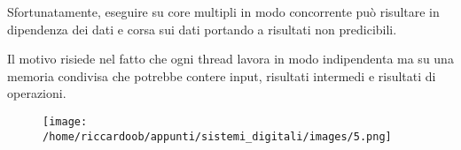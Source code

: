 Sfortunatamente, eseguire su core multipli in modo concorrente può risultare in dipendenza dei dati e corsa sui dati portando a risultati non predicibili.

Il motivo risiede nel fatto che ogni thread lavora in modo indipendenta ma su una memoria condivisa che potrebbe contere input, risultati intermedi e risultati di operazioni.

\begin{figure}[H]
    \centering
    \texttt{[image: /home/riccardoob/appunti/sistemi\_digitali/images/5.png]}
\end{figure}


















